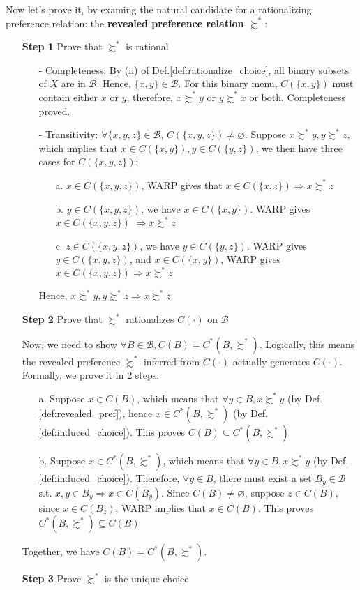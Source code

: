 Now let's prove it, by examing the natural candidate for a rationalizing preference relation: the \textbf{revealed preference relation $\succsim^*$}:
\begin{enumerate}
    \item[\textbf{Step 1}] Prove that $\succsim^*$ is rational
    \begin{enumerate}
        \item[-] Completeness: By (ii) of Def.\ref{def:rationalize_choice}, all binary subsets of $X$ are in $\mathcal{B}$. Hence, $\{x,y\}\in\mathcal{B}$. For this binary menu, $C(\{x,y\})$ must contain either $x$ or $y$, therefore, $x\succsim^*y$ or $y\succsim^* x$ or both. Completeness proved.
        \item[-] Transitivity: $\forall\{x,y,z\}\in \mathcal{B}$, $C(\{x,y,z\})\neq \varnothing$. Suppose $x\succsim^*y,y\succsim^*z$, which implies that $x\in C(\{x,y\}),y\in C(\{y,z\})$, we then have three cases for $C(\{x,y,z\})$:
        \begin{enumerate}
            \item[a.] $x\in C(\{x,y,z\})$, WARP gives that $x\in C(\{x,z\})\Rightarrow x\succsim^*z$
            \item[b.] $y\in C(\{x,y,z\})$, we have $x\in C(\{x,y\})$. WARP gives $x\in C(\{x,y,z\})$ $\Rightarrow x\succsim^* z$
            \item[c.] $z\in C(\{x,y,z\})$, we have $y\in C(\{y,z\})$. WARP gives $y\in C(\{x,y,z\})$, and $x\in C(\{x,y\})$, WARP gives $x\in C(\{x,y,z\})\Rightarrow x\succsim^*z$
        \end{enumerate} 
        Hence, $x\succsim^*y,y\succsim^*z\Rightarrow x\succsim^* z$
    \end{enumerate} 
    \item[\textbf{Step 2}] Prove that $\succsim^*$ rationalizes $C(\cdot)$ on $\mathcal{B}$
    
    Now, we need to show $\forall B\in\mathcal{B}, C(B)=C^*(B,\succsim^*)$. Logically, this means the revealed preference $\succsim^*$ inferred from $C(\cdot)$ actually generates $C(\cdot)$. Formally, we prove it in 2 steps:
    \begin{enumerate}
        \item[a.] Suppose $x\in C(B)$, which means that $\forall y\in B, x\succsim^* y$ (by Def.\ref{def:revealed_pref}), hence $x\in C^*(B,\succsim^*)$ (by Def.\ref{def:induced_choice}). This proves $C(B)\subseteq C^*(B,\succsim^*)$
        \item[b.] Suppose $x\in C^*(B,\succsim^*)$, which means that $\forall y\in B, x\succsim^* y$ (by Def.\ref{def:induced_choice}). Therefore, $\forall y\in B$, there must exist a set $B_y\in\mathcal{B}$ s.t.
         $x,y\in B_y\Rightarrow x\in C(B_y)$. Since $C(B)\neq \varnothing$, suppose $z\in C(B)$, since $x\in C(B_z)$, WARP implies that $x\in C(B)$. This proves $C^*(B,\succsim^*)\subseteq C(B)$
    \end{enumerate}
    Together, we have $C(B)=C^*(B,\succsim^*)$.
    \item[\textbf{Step 3}] Prove $\succsim^*$ is the unique choice
    

\end{enumerate}

